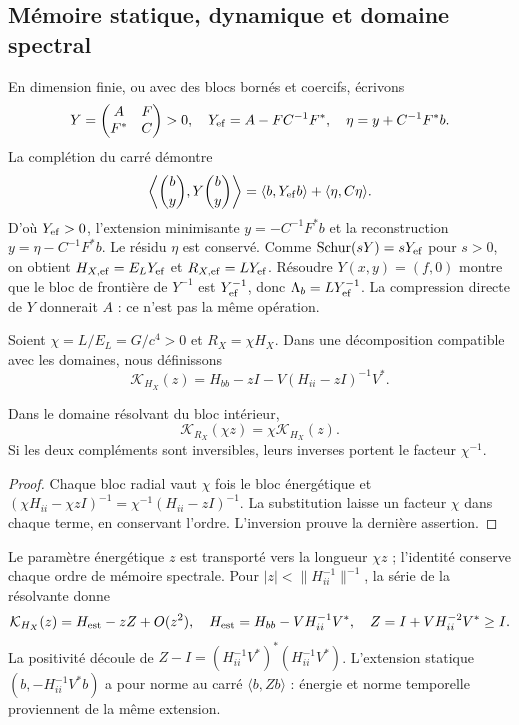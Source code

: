 \subsection{Mémoire statique, dynamique et domaine spectral}
\label{hmtcuatro:gea:memoria}

En dimension finie, ou avec des blocs bornés et coercifs, écrivons
\[
Y=\begin{pmatrix}A&F\\F^*&C\end{pmatrix}>0,\quad
Y_{\rm ef}=A-FC^{-1}F^*,\quad \eta=y+C^{-1}F^*b.
\]
La complétion du carré démontre
\begin{equation}
\left\langle\binom b y,Y\binom b y\right\rangle
=\langle b,Y_{\rm ef}b\rangle+\langle\eta,C\eta\rangle.
\label{hmtcuatro:gea:schur-prueba}
\end{equation}
D’où $Y_{\rm ef}>0$, l’extension minimisante $y=-C^{-1}F^*b$ et la reconstruction $y=\eta-C^{-1}F^*b$. Le résidu $\eta$ est conservé. Comme $\operatorname{Schur}(sY)=sY_{\rm ef}$ pour $s>0$, on obtient $H_{X,\rm ef}=E_LY_{\rm ef}$ et $R_{X,\rm ef}=LY_{\rm ef}$. Résoudre $Y(x,y)=(f,0)$ montre que le bloc de frontière de $Y^{-1}$ est $Y_{\rm ef}^{-1}$, donc $\Lambda_b=LY_{\rm ef}^{-1}$. La compression directe de $Y$ donnerait $A$ : ce n’est pas la même opération.

Soient $\chi=L/E_L=G/c^4>0$ et $R_X=\chi H_X$. Dans une décomposition compatible avec les domaines, nous définissons
\[
\mathcal K_{H_X}(z)=H_{bb}-zI-V(H_{ii}-zI)^{-1}V^*.
\]
\begin{proposition}
\label{hmtcuatro:gea:resolvente-prop} Dans le domaine résolvant du bloc intérieur,
\begin{equation}
\mathcal K_{R_X}(\chi z)=\chi\mathcal K_{H_X}(z).
\label{hmtcuatro:gea:resolvente}
\end{equation}
Si les deux compléments sont inversibles, leurs inverses portent le facteur $\chi^{-1}$.
\end{proposition}
\begin{proof}
Chaque bloc radial vaut $\chi$ fois le bloc énergétique et $(\chi H_{ii}-\chi zI)^{-1}=\chi^{-1}(H_{ii}-zI)^{-1}$. La substitution laisse un facteur $\chi$ dans chaque terme, en conservant l’ordre. L’inversion prouve la dernière assertion.
\end{proof}
Le paramètre énergétique $z$ est transporté vers la longueur $\chi z$ ; l’identité conserve chaque ordre de mémoire spectrale. Pour $|z|<\|H_{ii}^{-1}\|^{-1}$, la série de la résolvante donne
\[
\mathcal K_{H_X}(z)=H_{\rm est}-zZ+O(z^2),\quad
H_{\rm est}=H_{bb}-VH_{ii}^{-1}V^*,\quad
Z=I+VH_{ii}^{-2}V^*\geq I.
\]
La positivité découle de $Z-I=(H_{ii}^{-1}V^*)^*(H_{ii}^{-1}V^*)$. L’extension statique $(b,-H_{ii}^{-1}V^*b)$ a pour norme au carré $\langle b,Zb\rangle$ : énergie et norme temporelle proviennent de la même extension.

